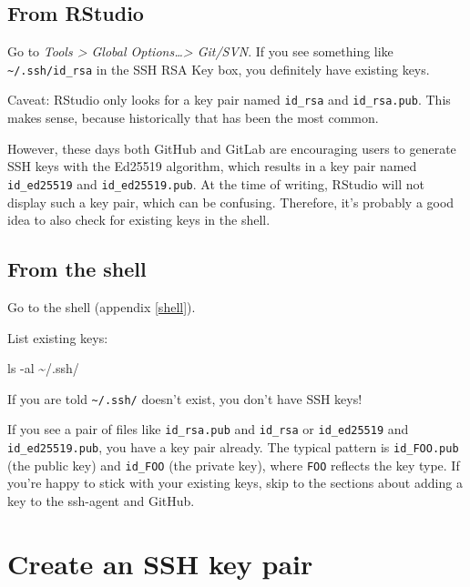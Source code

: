 \documentclass[
]{book}
\newenvironment{Shaded}{\begin{snugshade}}{\end{snugshade}}
\newcommand{\NormalTok}[1]{#1}
\begin{document}
\subsection{From RStudio}\label{from-rstudio}

Go to \emph{Tools \textgreater{} Global Options\ldots\textgreater{} Git/SVN}. If you see something like \texttt{\textasciitilde{}/.ssh/id\_rsa} in the SSH RSA Key box, you definitely have existing keys.

Caveat: RStudio only looks for a key pair named \texttt{id\_rsa} and \texttt{id\_rsa.pub}.
This makes sense, because historically that has been the most common.

However, these days both GitHub and GitLab are encouraging users to generate SSH keys with the Ed25519 algorithm, which results in a key pair named \texttt{id\_ed25519} and \texttt{id\_ed25519.pub}.
At the time of writing, RStudio will not display such a key pair, which can be confusing.
Therefore, it's probably a good idea to also check for existing keys in the shell.

\subsection{From the shell}\label{from-the-shell}

Go to the shell (appendix \ref{shell}).

List existing keys:

\begin{Shaded}
\begin{Highlighting}[]
\NormalTok{ls {-}al \textasciitilde{}/.ssh/}
\end{Highlighting}
\end{Shaded}

If you are told \texttt{\textasciitilde{}/.ssh/} doesn't exist, you don't have SSH keys!

If you see a pair of files like \texttt{id\_rsa.pub} and \texttt{id\_rsa} or \texttt{id\_ed25519} and \texttt{id\_ed25519.pub}, you have a key pair already.
The typical pattern is \texttt{id\_FOO.pub} (the public key) and \texttt{id\_FOO} (the private key), where \texttt{FOO} reflects the key type.
If you're happy to stick with your existing keys, skip to the sections about adding a key to the ssh-agent and GitHub.

\section{Create an SSH key pair}\label{create-an-ssh-key-pair}
\end{document}
